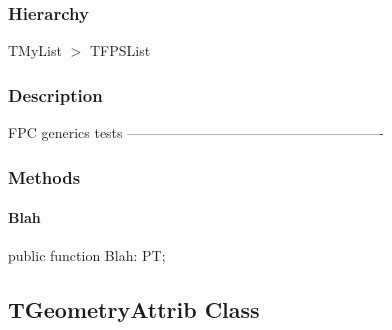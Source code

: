 \documentclass{report}
\newif\ifpdf
\begin{document}
\subsubsection*{\large{\textbf{Hierarchy}}\normalsize\hspace{1ex}\hfill}
TMyList {$>$} TFPSList
\subsubsection*{\large{\textbf{Description}}\normalsize\hspace{1ex}\hfill}
FPC generics tests ------------------------------------------------------{-}\subsubsection*{\large{\textbf{Methods}}\normalsize\hspace{1ex}\hfill}
\paragraph*{Blah}\hspace*{\fill}

\label{ok_generic.TMyList-Blah}
\begin{list}{}{
\setlength{\itemindent}{0cm}
\setlength{\listparindent}{0cm}
\setlength{\leftmargin}{\evensidemargin}
\addtolength{\leftmargin}{\tmplength}
\settowidth{\labelsep}{X}
\addtolength{\leftmargin}{\labelsep}
\setlength{\labelwidth}{\tmplength}
}
\item[\textbf{Declaration}\hfill]
\ifpdf
\begin{flushleft}
\fi
\begin{ttfamily}
public function Blah: PT;\end{ttfamily}

\ifpdf
\end{flushleft}
\fi

\end{list}
\ifpdf
\subsection*{\large{\textbf{TGeometryAttrib Class}}\normalsize\hspace{1ex}\hrulefill}
\else
\subsection*{TGeometryAttrib Class}
\fi
\label{ok_generic.TGeometryAttrib}
\end{document}
